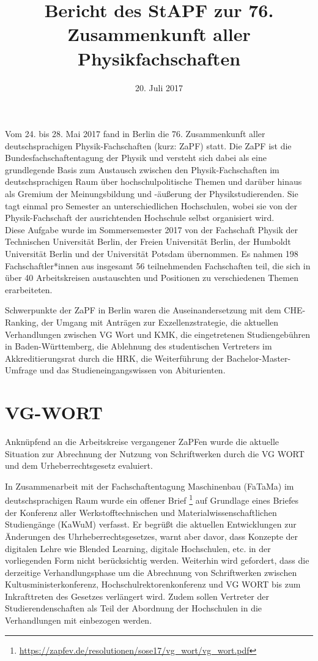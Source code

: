 \documentclass[a4paper]{article}
\begin{document}
	
\title{Bericht des StAPF zur 76. Zusammenkunft aller Physikfachschaften}
\date{20. Juli 2017}

\maketitle

Vom 24. bis 28. Mai 2017 fand in Berlin die 76. Zusammenkunft
aller deutschsprachigen Physik-Fachschaften (kurz: ZaPF) statt.  Die ZaPF ist
die Bundesfachschaftentagung der Physik und versteht sich dabei als eine
grundlegende Basis zum Austausch zwischen den Physik-Fachschaften im
deutschsprachigen Raum über hochschulpolitische Themen und darüber hinaus als
Gremium der Meinungsbildung und -äußerung der Physikstudierenden. Sie tagt
einmal pro Semester an unterschiedlichen Hochschulen, wobei sie von der
Physik-Fachschaft der ausrichtenden Hochschule selbst organisiert wird. 
\\

Diese Aufgabe wurde im Sommersemester 2017 von der Fachschaft Physik der Technischen Universität Berlin, der Freien Universität Berlin, der Humboldt Universität Berlin und der Universität Potsdam übernommen. 
Es nahmen 198 Fachschaftler*innen aus insgesamt 56 teilnehmenden Fachschaften teil, 
die sich in über 40 Arbeitskreisen austauschten und Positionen zu verschiedenen Themen erarbeiteten.

Schwerpunkte der ZaPF in Berlin waren die Auseinandersetzung mit dem CHE-Ranking, der Umgang mit Anträgen zur Exzellenzstrategie, die aktuellen Verhandlungen zwischen VG Wort und KMK, die eingetretenen Studiengebühren in Baden-Württemberg, die Ablehnung des studentischen Vertreters im Akkreditierungsrat durch die HRK, 
die Weiterführung der Bachelor-Master-Umfrage und das Studieneingangswissen von Abiturienten.

\newpage

\section*{VG-WORT}
Anknüpfend an die Arbeitskreise vergangener ZaPFen wurde die aktuelle Situation zur Abrechnung der Nutzung von Schriftwerken durch die VG WORT und dem Urheberrechtsgesetz evaluiert. 

In Zusammenarbeit mit der Fachschaftentagung Maschinenbau (FaTaMa) im deutschsprachigen Raum wurde ein offener Brief \footnote{\href{https://zapfev.de/resolutionen/sose17/vg_wort/vg_wort.pdf}{\url{https://zapfev.de/resolutionen/sose17/vg_wort/vg_wort.pdf}}} auf Grundlage eines Briefes der Konferenz aller Werkstofftechnischen und Materialwissenschaftlichen Studiengänge (KaWuM) verfasst. Er begrüßt die aktuellen Entwicklungen zur Änderungen des Uhrheberrechtsgesetzes, warnt aber davor, dass Konzepte der digitalen Lehre wie Blended Learning, digitale Hochschulen, etc. in der vorliegenden Form nicht berücksichtig werden. Weiterhin wird gefordert, dass die derzeitige Verhandlungsphase um die Abrechnung von Schriftwerken zwischen Kultusministerkonferenz, Hochschulrektorenkonferenz und VG WORT bis zum Inkrafttreten des Gesetzes verlängert wird. Zudem sollen Vertreter der Studierendenschaften als Teil der Abordnung der Hochschulen in die Verhandlungen mit einbezogen werden.
\end{document}
